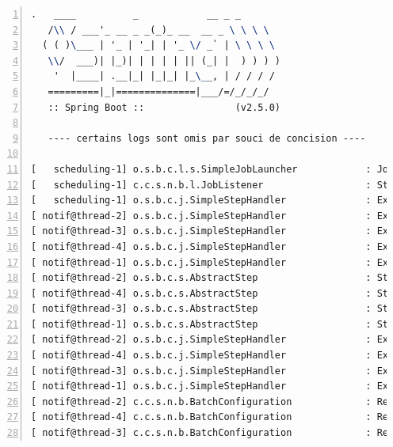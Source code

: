 \begin{lstlisting}[style=DOS,numbers=left,language=tex, deletekeywords={for,source,test}, morekeywords={certains, logs, sont, omis, par, souci, de, concision}]
    .   ____          _            __ _ _
   /\\ / ___'_ __ _ _(_)_ __  __ _ \ \ \ \
  ( ( )\___ | '_ | '_| | '_ \/ _` | \ \ \ \
   \\/  ___)| |_)| | | | | || (_| |  ) ) ) )
    '  |____| .__|_| |_|_| |_\__, | / / / /
   =========|_|==============|___/=/_/_/_/
   :: Spring Boot ::                (v2.5.0)

   ---- certains logs sont omis par souci de concision ----

[   scheduling-1] o.s.b.c.l.s.SimpleJobLauncher            : Job: [SimpleJob: [name=notification-manager]] launched with the following parameters: [{supportedClientKeys=SMART;DEMO;CGW;TEST, @=1634983159017}]
[   scheduling-1] c.c.s.n.b.l.JobListener                  : Starting job...
[   scheduling-1] o.s.b.c.j.SimpleStepHandler              : Executing step: [partitionStep]
[ notif@thread-2] o.s.b.c.j.SimpleStepHandler              : Executing step: [csv-inprogress]
[ notif@thread-3] o.s.b.c.j.SimpleStepHandler              : Executing step: [csv-inprogress]
[ notif@thread-4] o.s.b.c.j.SimpleStepHandler              : Executing step: [csv-inprogress]
[ notif@thread-1] o.s.b.c.j.SimpleStepHandler              : Executing step: [csv-inprogress]
[ notif@thread-2] o.s.b.c.s.AbstractStep                   : Step: [csv-inprogress] executed in 482ms
[ notif@thread-4] o.s.b.c.s.AbstractStep                   : Step: [csv-inprogress] executed in 476ms
[ notif@thread-3] o.s.b.c.s.AbstractStep                   : Step: [csv-inprogress] executed in 477ms
[ notif@thread-1] o.s.b.c.s.AbstractStep                   : Step: [csv-inprogress] executed in 474ms
[ notif@thread-2] o.s.b.c.j.SimpleStepHandler              : Executing step: [csv-processor]
[ notif@thread-4] o.s.b.c.j.SimpleStepHandler              : Executing step: [csv-processor]
[ notif@thread-3] o.s.b.c.j.SimpleStepHandler              : Executing step: [csv-processor]
[ notif@thread-1] o.s.b.c.j.SimpleStepHandler              : Executing step: [csv-processor]
[ notif@thread-2] c.c.s.n.b.BatchConfiguration             : Reading file : C:/arkeviavars/inprogress/client4.csv
[ notif@thread-4] c.c.s.n.b.BatchConfiguration             : Reading file : C:/arkeviavars/inprogress/client3.csv
[ notif@thread-3] c.c.s.n.b.BatchConfiguration             : Reading file : C:/arkeviavars/inprogress/client1.csv

\end{lstlisting}
